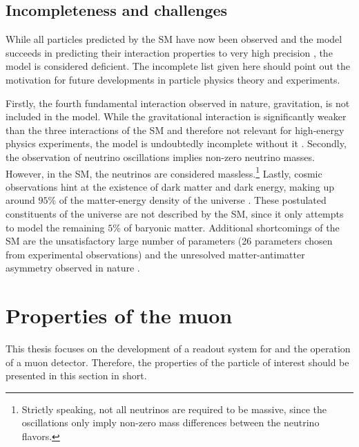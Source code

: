 \subsection{Incompleteness and challenges}
While all particles predicted by the \ac{SM} have now been observed \cite{SM-Gaillard} and the model succeeds in predicting their interaction properties to very high precision \cite{SM-CMSMeasurements}, the model is considered deficient. The incomplete list given here should point out the motivation for future developments in particle physics theory and experiments.
\par Firstly, the fourth fundamental interaction observed in nature, gravitation, is not included in the model. While the gravitational interaction is significantly weaker than the three interactions of the \ac{SM} and therefore not relevant for high-energy physics experiments, the model is undoubtedly incomplete without it \cite{SM-Gaillard}. Secondly, the observation of neutrino oscillations \cite{NO-Davis,Book-Thomson} implies non-zero neutrino masses. However, in the \ac{SM}, the neutrinos are considered massless.\footnote{Strictly speaking, not all neutrinos are required to be massive, since the oscillations only imply non-zero mass differences between the neutrino flavors.} Lastly, cosmic observations hint at the existence of dark matter and dark energy, making up around $95\%$ of the matter-energy density of the universe \cite{DM-Trimble, Book-Thomson}. These postulated constituents of the universe are not described by the \ac{SM}, since it only attempts to model the remaining $5\%$ of baryonic matter. Additional shortcomings of the \ac{SM} are the unsatisfactory large number of parameters (26 parameters chosen from experimental observations) and the unresolved matter-antimatter asymmetry observed in nature \cite{Book-Thomson}.


\FloatBarrier
\section{Properties of the muon}
\label{sec:SM-Muon}
This thesis focuses on the development of a readout system for and the operation of a muon detector. Therefore, the properties of the particle of interest should be presented in this section in short.

